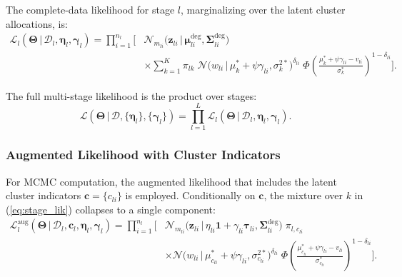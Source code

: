 \documentclass[a4paper,fleqn,longmktitle]{cas-sc}
\newcommand{\given}{\,|\,}
\newcommand{\normal}{\mathcal{N}}
\begin{document}
The complete-data likelihood for stage $l$, marginalizing over the latent cluster allocations, is:
\begin{equation}\label{eq:stage_lik}
    \begin{aligned}
        \mathcal{L}_l(\bm{\Theta} \given \mathcal{D}_l, \bm{\eta}_l, \bm{\gamma}_l)
        = \prod_{i=1}^{n_l} \Bigg[
            &\normal_{m_{li}}\!\bigl(\bm{z}_{li} \given \bm{\mu}_{li}^{\text{deg}}, \bm{\Sigma}_{li}^{\text{deg}}\bigr) \\
            &\times \sum_{k=1}^{K} \pi_{lk} \;
            \normal\!\bigl(w_{li} \given \mu_k^* + \psi\gamma_{li}, \sigma_k^{2*}\bigr)^{\delta_{li}}
            \;\Phi\!\left(\frac{\mu_k^* + \psi\gamma_{li} - v_{li}}{\sigma_k^*}\right)^{1 - \delta_{li}}
        \Bigg].
    \end{aligned}
\end{equation}

The full multi-stage likelihood is the product over stages:
\begin{equation}\label{eq:full_lik}
    \mathcal{L}(\bm{\Theta} \given \mathcal{D}, \{\bm{\eta}_l\}, \{\bm{\gamma}_l\})
    = \prod_{l=1}^{L} \mathcal{L}_l(\bm{\Theta} \given \mathcal{D}_l, \bm{\eta}_l, \bm{\gamma}_l).
\end{equation}

\subsubsection{Augmented Likelihood with Cluster Indicators}

For MCMC computation, the augmented likelihood that includes the latent cluster indicators $\bm{c} = \{c_{li}\}$ is employed. Conditionally on $\bm{c}$, the mixture over $k$ in (\ref{eq:stage_lik}) collapses to a single component:
\begin{equation}\label{eq:aug_lik}
    \begin{aligned}
        \mathcal{L}_l^{\text{aug}}(\bm{\Theta} \given \mathcal{D}_l, \bm{c}_l, \bm{\eta}_l, \bm{\gamma}_l)
        = \prod_{i=1}^{n_l} \Bigg[
            &\normal_{m_{li}}\!\bigl(\bm{z}_{li} \given \eta_{li}\bm{1} + \gamma_{li}\bm{\tau}_{li}, \bm{\Sigma}_{li}^{\text{deg}}\bigr) \;
            \pi_{l,c_{li}} \\
            &\times \normal\!\bigl(w_{li} \given \mu_{c_{li}}^* + \psi\gamma_{li}, \sigma_{c_{li}}^{2*}\bigr)^{\delta_{li}}
            \;\Phi\!\left(\frac{\mu_{c_{li}}^* + \psi\gamma_{li} - v_{li}}{\sigma_{c_{li}}^*}\right)^{1 - \delta_{li}}
        \Bigg].
    \end{aligned}
\end{equation}
\end{document}
